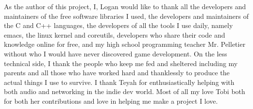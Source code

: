 \documentclass[11pt]{article}
\begin{document}
As the author of this project, I, Logan would like to thank all the developers and maintainers of the free software libraries I used, the developers and maintainers of the C and C++ languages, the developers of all the tools I use daily, namely emacs, the linux kernel and coreutils, developers who share their code and knowledge online for free, and my high school programming teacher Mr. Pelletier without who I would have never discovered game development. On the less technical side, I thank the people who keep me fed and sheltered including my parents and all those who have worked hard and thanklessly to produce the actual things I use to survive. I thank Teyah for enthusiastically helping with both audio and networking in the indie dev world. Most of all my love Tobi both for both her contributions and love in helping me make a project I love.
\end{document}
